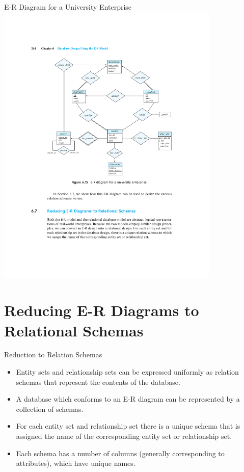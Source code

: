 \documentclass{beamer}
\begin{document}
\begin{frame}{E-R Diagram for a University Enterprise}
    \centering
    \includegraphics[trim={4.55cm 10.80cm 4.00cm 4.85cm}, clip, width=0.8\textwidth]{figures/p264}
\end{frame}

\section{Reducing E-R Diagrams to Relational Schemas}

\begin{frame}{Reduction to Relation Schemas}
    \begin{itemize}
        \item Entity sets and relationship sets can be expressed uniformly as relation schemas that represent the contents of the database.
        \item A database which conforms to an E-R diagram can be represented by a collection of schemas.
        \item For each entity set and relationship set there is a unique schema that is assigned the name of the corresponding entity set or relationship set.
        \item Each schema has a number of columns (generally corresponding to attributes), which have unique names.
    \end{itemize}
\end{frame}
\end{document}
